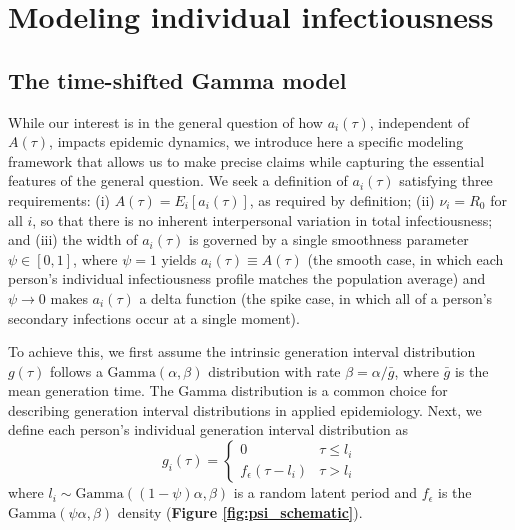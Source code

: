  \clearpage
\section{Modeling individual infectiousness}

\subsection{The time-shifted Gamma model}

While our interest is in the general question of how $a_i(\tau)$, independent of $A(\tau)$, impacts epidemic dynamics, we introduce here a specific modeling framework that allows us to make precise claims while capturing the essential features of the general question. We seek a definition of $a_i(\tau)$ satisfying three requirements: (i) $A(\tau) = E_i[a_i(\tau)]$, as required by definition; (ii) $\nu_i = R_0$ for all $i$, so that there is no inherent interpersonal variation in total infectiousness; and (iii) the width of $a_i(\tau)$ is governed by a single smoothness parameter $\psi \in [0,1]$, where $\psi = 1$ yields $a_i(\tau) \equiv A(\tau)$ (the smooth case, in which each person's individual infectiousness profile matches the population average) and $\psi \to 0$ makes $a_i(\tau)$ a delta function (the spike case, in which all of a person's secondary infections occur at a single moment).

To achieve this, we first assume the intrinsic generation interval distribution $g(\tau)$ follows a $\text{Gamma}(\alpha, \beta)$ distribution with rate $\beta = \alpha/\bar{g}$, where $\bar{g}$ is the mean generation time. The Gamma distribution is a common choice for describing generation interval distributions in applied epidemiology. Next, we define each person's individual generation interval distribution as
%
\begin{equation}
    g_i(\tau) = \begin{cases}
      0 & \tau \leq l_i \\
      f_\epsilon(\tau - l_i) & \tau > l_i
    \end{cases}
    \label{eq:gamma_timeshift}
\end{equation}
%
where $l_i \sim \text{Gamma}((1 - \psi)\alpha, \beta)$ is a random latent period and $f_\epsilon$ is the $\text{Gamma}(\psi\alpha, \beta)$ density ({\bf Figure \ref{fig:psi_schematic}}). 

